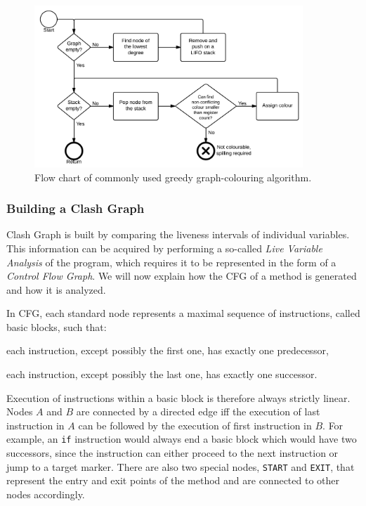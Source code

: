 \documentclass[12pt,twoside,notitlepage]{report}
\begin{document}
\begin{figure}
	\centerline{	
		\includegraphics[width=0.9\textwidth]{figs/fig_implementation_gc.png}
	}
	\caption{Flow chart of commonly used greedy graph-colouring algorithm.}
	\label{fig:Implementation_GraphColouring}
\end{figure}

\subsubsection{Building a Clash Graph}

Clash Graph is built by comparing the liveness intervals of individual variables. This information can be acquired by performing a so-called \emph{Live Variable Analysis} of the program, which requires it to be represented in the form of a \emph{Control Flow Graph}. We will now explain how the CFG of a method is generated and how it is analyzed.

In CFG, each standard node represents a maximal sequence of instructions, called basic blocks, such that:
\begin{inparaenum}[(i)]
\item each instruction, except possibly the first one, has exactly one predecessor,
\item each instruction, except possibly the last one, has exactly one successor.
\end{inparaenum}
Execution of instructions within a basic block is therefore always strictly linear. Nodes $A$ and $B$ are connected by a directed edge iff the execution of last instruction in $A$ can be followed by the execution of first instruction in $B$. For example, an \verb$if$ instruction would always end a basic block which would have two successors, since the instruction can either proceed to the next instruction or jump to a target marker. There are also two special nodes, \verb$START$ and \verb$EXIT$, that represent the entry and exit points of the method and are connected to other nodes accordingly.
\end{document}
